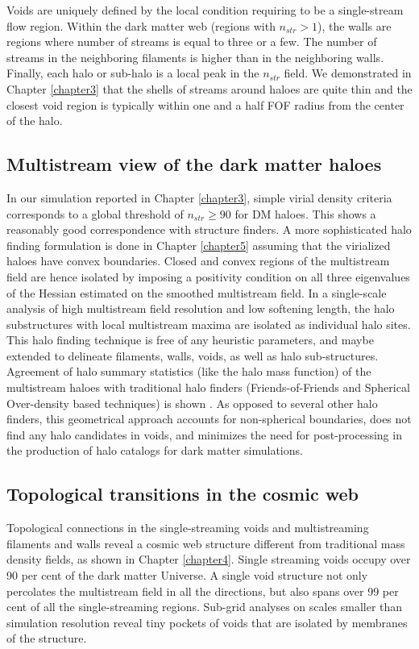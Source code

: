 Voids are uniquely defined by the local condition requiring to be a single-stream flow region. Within the dark matter web (regions with $n_{str} > 1$), the walls are regions where number of streams is equal to three or a few. The number of streams in the neighboring filaments is higher than in the neighboring walls. Finally, each halo or sub-halo is a local peak in the $n_{str}$ field. We demonstrated in Chapter \ref{chapter3} that the shells of streams around haloes are quite thin and the closest void region is typically within one and a half FOF radius from the center of the halo.

\subsection{Multistream view of the dark matter haloes}

In our simulation reported in Chapter \ref{chapter3}, simple virial density criteria corresponds to a global threshold of $n_{str} \geq 90$ for DM haloes. This shows a reasonably good correspondence with structure finders. A more sophisticated halo finding formulation is done in Chapter \ref{chapter5} assuming that the virialized haloes have convex boundaries. Closed and convex regions of the multistream field are hence isolated by imposing a positivity condition on all three eigenvalues of the Hessian estimated on the smoothed multistream field. In a single-scale analysis of high multistream field resolution and low softening length, the halo substructures with local multistream maxima are isolated as individual halo sites. This halo finding technique is free of any heuristic parameters, and maybe extended to delineate filaments, walls, voids, as well as halo sub-structures. Agreement of halo summary statistics (like the halo mass function) of the multistream haloes with traditional halo finders (Friends-of-Friends and Spherical Over-density based techniques) is shown \cite{Ramachandra2017b}. As opposed to several other halo finders, this geometrical approach accounts for non-spherical boundaries, does not find any halo candidates in voids, and minimizes the need for post-processing in the production of halo catalogs for dark matter simulations.   

\subsection{Topological transitions in the cosmic web}

Topological connections in the single-streaming voids and multistreaming filaments and walls reveal a cosmic web structure different from traditional mass density fields, as shown in Chapter \ref{chapter4}. Single streaming voids occupy over 90 per cent of the dark matter Universe. A single void structure not only percolates the multistream field in all the directions, but also spans over 99 per cent of all the single-streaming regions. Sub-grid analyses on scales smaller than simulation resolution reveal tiny pockets of voids that are isolated by membranes of the structure. 

